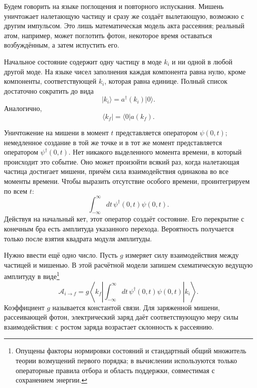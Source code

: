 Будем говорить на языке поглощения и повторного испускания. Мишень уничтожает налетающую частицу и сразу же создаёт вылетающую, возможно с другим импульсом. Это лишь математическая модель акта рассеяния; реальный атом, например, может поглотить фотон, некоторое время оставаться возбуждённым, а затем испустить его.

\begin{classroomqa}
\end{classroomqa}

Начальное состояние содержит одну частицу в моде \(k_i\) и ни одной в любой другой моде. На языке чисел заполнения каждая компонента равна нулю, кроме компоненты, соответствующей \(k_i\), которая равна единице. Полный список достаточно сократить до вида
\begin{equation}
\lvert k_i\rangle=a^\dagger(k_i)\lvert0\rangle.
\end{equation}
Аналогично,
\begin{equation}
\langle k_f\rvert=\langle0\rvert a(k_f).
\end{equation}

Уничтожение на мишени в момент \(t\) представляется оператором \(\psi(0,t)\); немедленное создание в той же точке и в тот же момент представляется оператором \(\psi^\dagger(0,t)\). Нет никакого выделенного момента времени, в который происходит это событие. Оно может произойти всякий раз, когда налетающая частица достигает мишени, причём сила взаимодействия одинакова во все моменты времени. Чтобы выразить отсутствие особого времени, проинтегрируем по всем \(t\):
\begin{equation}
\int_{-\infty}^{\infty}dt\,\psi^\dagger(0,t)\psi(0,t).
\end{equation}
Действуя на начальный кет, этот оператор создаёт состояние. Его перекрытие с конечным бра есть амплитуда указанного перехода. Вероятность получается только после взятия квадрата модуля амплитуды.

Нужно ввести ещё одно число. Пусть \(g\) измеряет силу взаимодействия между частицей и мишенью. В этой расчётной модели запишем схематическую ведущую амплитуду в виде\footnote{Опущены факторы нормировки состояний и стандартный общий множитель теории возмущений первого порядка; в вычислении используются только операторные правила отбора и область поддержки, совместимая с сохранением энергии.}
\begin{equation}
\mathcal A_{i\to f}
=g\left\langle k_f\left|
\int_{-\infty}^{\infty}dt\,
\psi^\dagger(0,t)\psi(0,t)
\right|k_i\right\rangle.
\end{equation}
Коэффициент \(g\) называется константой связи. Для заряженной мишени, рассеивающей фотон, электрический заряд даёт соответствующую меру силы взаимодействия: с ростом заряда возрастает склонность к рассеянию.

